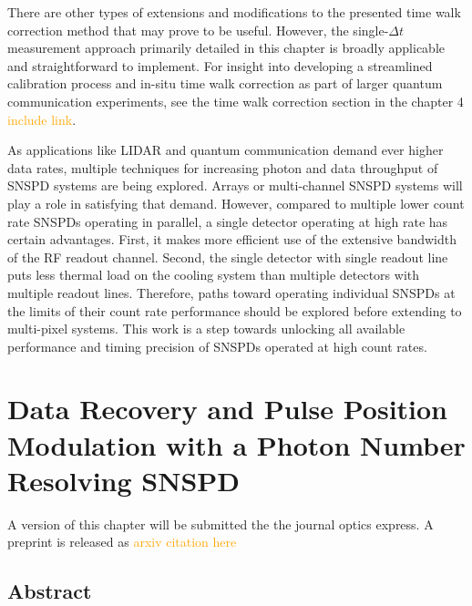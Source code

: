 \documentclass[11pt]{caltech_thesis} %
\begin{document}
There are other types of extensions and modifications to the presented time walk correction method that may prove to be useful. However, the single-$\Delta t$ measurement approach primarily detailed in this chapter is broadly applicable and straightforward to implement. For insight into developing a streamlined calibration process and in-situ time walk correction as part of larger quantum communication experiments, see the time walk correction section in the chapter 4 \textcolor{orange}{include link}.

As applications like LIDAR and quantum communication demand ever higher data rates, multiple techniques for increasing photon and data throughput of SNSPD systems are being explored. Arrays or multi-channel SNSPD systems will play a role in satisfying that demand. However, compared to multiple lower count rate SNSPDs operating in parallel, a single detector operating at high rate has certain advantages. First, it makes more efficient use of the extensive bandwidth of the RF readout channel. Second, the single detector with single readout line puts less thermal load on the cooling system than multiple detectors with multiple readout lines. Therefore, paths toward operating individual SNSPDs at the limits of their count rate performance should be explored before extending to multi-pixel systems. This work is a step towards unlocking all available performance and timing precision of SNSPDs operated at high count rates.

\hypertarget{data-recovery-and-pulse-position-modulation-with-a-photon-number-resolving-snspd}{%
\chapter{Data Recovery and Pulse Position Modulation with a Photon Number Resolving SNSPD}\label{data-recovery-and-pulse-position-modulation-with-a-photon-number-resolving-snspd}}

A version of this chapter will be submitted the the journal optics express. A preprint is released as \textcolor{orange}{arxiv citation here}

\hypertarget{abstract-2}{%
\section{Abstract}\label{abstract-2}}
\end{document}
